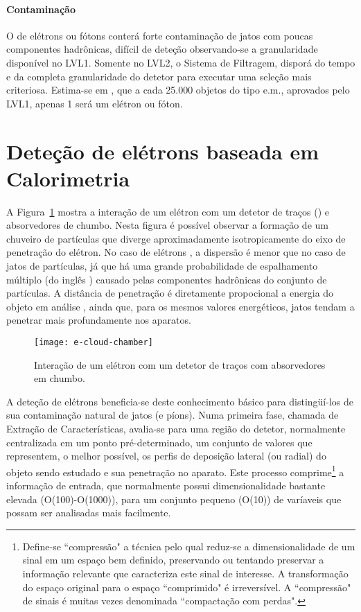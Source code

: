 \paragraph{Contaminação} O  de elétrons ou fótons conterá forte
contaminação de jatos com poucas componentes hadrônicas, difícil de deteção
observando-se a granularidade disponível no LVL1. Somente no LVL2, o Sistema
de Filtragem, disporá do tempo e da completa granularidade do detetor para
executar uma seleção mais criteriosa. Estima-se em \cite{daqnote00-02}, que a
cada 25.000 objetos do tipo e.m., aprovados pelo LVL1, apenas 1 será um
elétron ou fóton.

\section{Deteção de elétrons baseada em Calorimetria}
\label{sec:e-detection}

A Figura~\ref{fig:e-shower} mostra a interação de um elétron com um detetor de
traços () e absorvedores de chumbo. Nesta figura é
possível observar a formação de um chuveiro de partículas que diverge
aproximadamente isotropicamente do eixo de penetração do elétron. No caso de
elétrons \cite{wigmans-book}, a dispersão é menor que no caso de jatos de
partículas, já que há uma grande probabilidade de espalhamento múltiplo (do
inglês ) causado pelas componentes hadrônicas do
conjunto de partículas. A distância de penetração é diretamente propocional a
energia do objeto em análise \cite{leo, knoll}, ainda que, para os mesmos
valores energéticos, jatos tendam a penetrar mais profundamente nos aparatos.

\begin{figure}
\begin{center}
\texttt{[image: e-cloud-chamber]}
\end{center}
\caption{Interação de um elétron com um detetor de traços com absorvedores em
chumbo.} 
\label{fig:e-shower}
\end{figure}


A deteção de elétrons beneficia-se deste conhecimento básico para
distingüí-los de sua contaminação natural de jatos (e píons). Numa primeira
fase, chamada de Extração de Características, avalia-se para uma região do
detetor, normalmente centralizada em um ponto pré-determinado, um conjunto de
valores que representem, o melhor possível, os perfis de deposição lateral (ou
radial) do objeto sendo estudado e sua penetração no aparato. Este processo
comprime\footnote{Define-se ``compressão" a técnica pelo qual reduz-se a
dimensionalidade de um sinal em um espaço bem definido, preservando ou
tentando preservar a informação relevante que caracteriza este sinal de
interesse. A transformação do espaço original para o espaço ``comprimido" é
irreversível. A ``compressão" de sinais é muitas vezes denominada
``compactação com perdas".} a informação de entrada, que normalmente possui
dimensionalidade bastante elevada (O(100)-O(1000)), para um conjunto pequeno
(O(10)) de varíaveis que possam ser analisadas mais facilmente.

